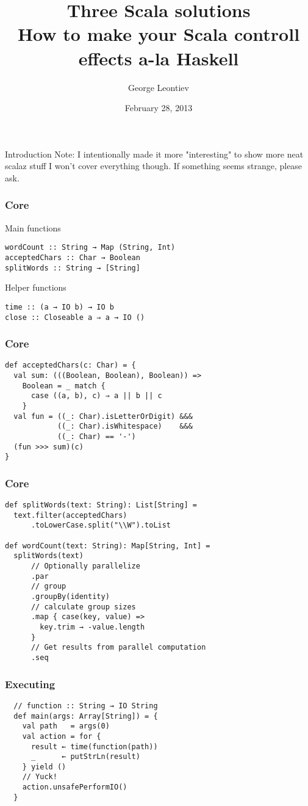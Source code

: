 \documentclass{beamer}
\title[Three Scala solutions]{Three Scala solutions\\How to make your Scala controll effects a-la Haskell}
\author{George Leontiev}
\institute{folone.info}
\date{February 28, 2013}
\begin{document}
\begin{frame}
\titlepage
\end{frame}


\begin{frame}{Introduction}
  Note: I intentionally made it more "interesting" to show more neat scalaz stuff\newline
  I won't cover everything though. If something seems strange, please ask.
\end{frame}

\begin{frame}[fragile]
\frametitle{Core}
Main functions
\begin{lstlisting}
wordCount :: String → Map (String, Int)
acceptedChars :: Char → Boolean
splitWords :: String → [String]
\end{lstlisting}
Helper functions
\begin{lstlisting}
time :: (a → IO b) → IO b
close :: Closeable a ⇒ a → IO ()
\end{lstlisting}
\end{frame}

\begin{frame}[fragile]
\frametitle{Core}
\begin{lstlisting}
def acceptedChars(c: Char) = {
  val sum: (((Boolean, Boolean), Boolean)) =>
    Boolean = _ match {
      case ((a, b), c) ⇒ a || b || c
    }
  val fun = ((_: Char).isLetterOrDigit) &&&
            ((_: Char).isWhitespace)    &&&
            ((_: Char) == '-')
  (fun >>> sum)(c)
}
\end{lstlisting}
\end{frame}

\begin{frame}[fragile]
\frametitle{Core}
\begin{lstlisting}
def splitWords(text: String): List[String] =
  text.filter(acceptedChars)
      .toLowerCase.split("\\W").toList

def wordCount(text: String): Map[String, Int] =
  splitWords(text)
      // Optionally parallelize
      .par
      // group
      .groupBy(identity)
      // calculate group sizes
      .map { case(key, value) =>
        key.trim → -value.length
      }
      // Get results from parallel computation
      .seq
\end{lstlisting}
\end{frame}

\begin{frame}[fragile]
\frametitle{Executing}
\begin{lstlisting}
  // function :: String → IO String
  def main(args: Array[String]) = {
    val path   = args(0)
    val action = for {
      result ← time(function(path))
      _      ← putStrLn(result)
    } yield ()
    // Yuck!
    action.unsafePerformIO()
  }
\end{lstlisting}
\end{frame}
\end{document}
